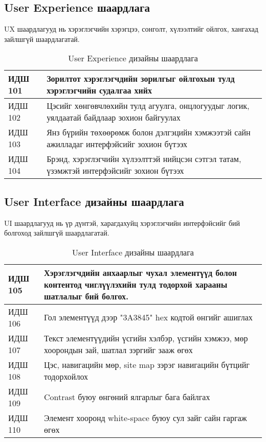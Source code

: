 \subsection{User Experience шаардлага}

UX шаардлагууд нь хэрэглэгчийн хэрэгцээ, сонголт, хүлээлтийг ойлгох, хангахад зайлшгүй шаардлагатай.

\begin{table}[h]
	\centering
	\caption{User Experience дизайны шаардлага}
	\begin{tabular}{ |p{2cm}|p{13cm}| }
		\hline
		ИДШ 101 & Зорилтот хэрэглэгчдийн зорилгыг ойлгохын тулд хэрэглэгчийн судалгаа хийх                                                 \\ \hline
		ИДШ 102 & Цэсийг хөнгөвчлөхийн тулд агуулга, онцлогуудыг логик, уялдаатай байдлаар зохион байгуулах                 \\ \hline
		ИДШ 103 & Янз бүрийн төхөөрөмж болон дэлгэцийн хэмжээтэй сайн ажилладаг интерфэйсийг зохион бүтээх                       \\ \hline
		ИДШ 104 & Брэнд, хэрэглэгчийн хүлээлттэй нийцсэн сэтгэл татам, үзэмжтэй интерфэйсийг зохион бүтээх                         \\ \hline
	\end{tabular}
\end{table}

\subsection{User Interface дизайны шаардлага}

UI шаардлагууд нь үр дүнтэй, харагдахуйц хэрэглэгчийн интерфэйсийг бий болгоход зайлшгүй шаардлагатай.

\begin{table}[h]
	\centering
	\caption{User Interface дизайны шаардлага}
	\begin{tabular}{ |p{2cm}|p{13cm}| }
		\hline
		ИДШ 105 & Хэрэглэгчдийн анхаарлыг чухал элементүүд болон контентод чиглүүлэхийн тулд тодорхой харааны шатлалыг бий болгох.                                                 \\ \hline
		ИДШ 106 & Гол элементүүд дээр "3A3845" hex кодтой өнгийг ашиглах                 \\ \hline
		ИДШ 107 & Текст элементүүдийн үсгийн хэлбэр, үсгийн хэмжээ, мөр хоорондын зай, шатлал зэргийг зааж өгөх                       \\ \hline
		ИДШ 108 & Цэс, навигацийн мөр, site map зэрэг навигацийн бүтцийг тодорхойлох                         \\ \hline
		ИДШ 109 & Contrast буюу өнгөний ялгарлыг бага байлгах                            \\ \hline
		ИДШ 110 & Элемент хооронд white-space буюу сул зайг сайн гаргаж өгөх             \\  \hline
	\end{tabular}
\end{table}
